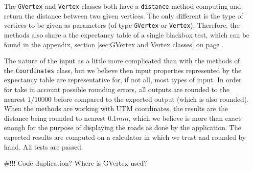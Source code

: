 The \texttt{GVertex} and \texttt{Vertex} classes both have a \texttt{distance} method computing and return the distance between two given vertices. The only different is the type of vertices to be given as parameters (of type \texttt{GVertex} or \texttt{Vertex}). Therefore, the methods also share a the expectancy table of a single blackbox test, which can be found in the appendix, section \ref{sec:GVertex and Vertex classes} on page \pageref{sec:GVertex and Vertex classes}.

The nature of the input as a little more complicated than with the methods of the \texttt{Coordinates} class, but we believe then input properties represented by the expectancy table are representative for, if not all, most types of input. In order for take in account possible rounding errors, all outputs are rounded to the nearest $1/10000$ before compared to the expected output (which is also rounded). When the methods are working with UTM coordinates, the results are the distance being rounded to nearest $0.1 mm$, which we believe is more than exact enough for the purpose of displaying the roads as done by the application. The expected results are computed on a calculator in which we trust and rounded by hand. All tests are passed.

\#!!! Code duplication? Where is GVertex used?

